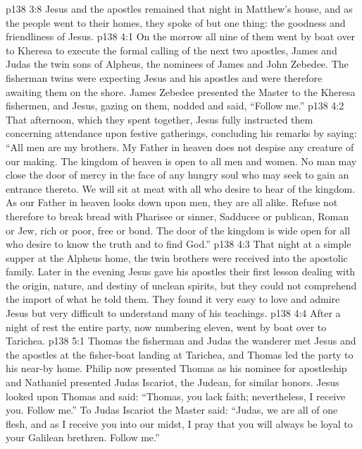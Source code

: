 \vs p138 3:8 Jesus and the apostles remained that night in Matthew’s house, and as the people went to their homes, they spoke of but one thing: the goodness and friendliness of Jesus.
\vs p138 4:1 On the morrow all nine of them went by boat over to Kheresa to execute the formal calling of the next two apostles, James and Judas the twin sons of Alpheus, the nominees of James and John Zebedee. The fisherman twins were expecting Jesus and his apostles and were therefore awaiting them on the shore. James Zebedee presented the Master to the Kheresa fishermen, and Jesus, gazing on them, nodded and said, \textcolor{ubdarkred}{“Follow me.”}
\vs p138 4:2 \pc That afternoon, which they spent together, Jesus fully instructed them concerning attendance upon festive gatherings, concluding his remarks by saying: \textcolor{ubdarkred}{“All men are my brothers. My Father in heaven does not despise any creature of our making. The kingdom of heaven is open to all men and women. No man may close the door of mercy in the face of any hungry soul who may seek to gain an entrance thereto. We will sit at meat with all who desire to hear of the kingdom. As our Father in heaven looks down upon men, they are all alike. Refuse not therefore to break bread with Pharisee or sinner, Sadducee or publican, Roman or Jew, rich or poor, free or bond. The door of the kingdom is wide open for all who desire to know the truth and to find God.”}
\vs p138 4:3 \pc That night at a simple supper at the Alpheus home, the twin brothers were received into the apostolic family. Later in the evening Jesus gave his apostles their first lesson dealing with the origin, nature, and destiny of unclean spirits, but they could not comprehend the import of what he told them. They found it very easy to love and admire Jesus but very difficult to understand many of his teachings.
\vs p138 4:4 After a night of rest the entire party, now numbering eleven, went by boat over to Tarichea.
\vs p138 5:1 Thomas the fisherman and Judas the wanderer met Jesus and the apostles at the fisher\hyp{}boat landing at Tarichea, and Thomas led the party to his near\hyp{}by home. Philip now presented Thomas as his nominee for apostleship and Nathaniel presented Judas Iscariot, the Judean, for similar honors. Jesus looked upon Thomas and said: \textcolor{ubdarkred}{“Thomas, you lack faith; nevertheless, I receive you. Follow me.”} To Judas Iscariot the Master said: \textcolor{ubdarkred}{“Judas, we are all of one flesh, and as I receive you into our midst, I pray that you will always be loyal to your Galilean brethren. Follow me.”}
